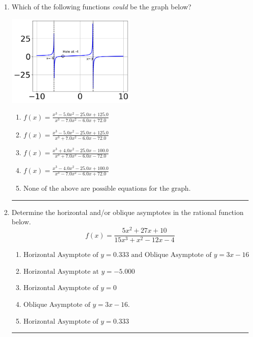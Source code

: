 \documentclass[14pt]{extbook}
\newcommand{\litem}[1]{\item#1\hspace*{-1cm}\rule{\textwidth}{0.4pt}}
\begin{document}
\begin{enumerate}
{\begin{enumerate}[label=\Alph*.]
\end{enumerate} }
\litem{
Which of the following functions \textit{could} be the graph below?
\begin{center}
    \includegraphics[width=0.5\textwidth]{../Figures/identifyGraphOfRationalFunctionCopyC.png}
\end{center}
\begin{enumerate}[label=\Alph*.]
\item \( f(x)=\frac{x^{3} -5.0 x^{2} -25.0 x + 125.0}{x^{3} -7.0 x^{2} -6.0 x + 72.0} \)
\item \( f(x)=\frac{x^{3} -5.0 x^{2} -25.0 x + 125.0}{x^{3} +7.0 x^{2} -6.0 x -72.0} \)
\item \( f(x)=\frac{x^{3} +4.0 x^{2} -25.0 x -100.0}{x^{3} +7.0 x^{2} -6.0 x -72.0} \)
\item \( f(x)=\frac{x^{3} -4.0 x^{2} -25.0 x + 100.0}{x^{3} -7.0 x^{2} -6.0 x + 72.0} \)
\item \( \text{None of the above are possible equations for the graph.} \)

\end{enumerate} }
\litem{
Determine the horizontal and/or oblique asymptotes in the rational function below.\[ f(x) = \frac{5x^{2} +27 x + 10}{15x^{3} + x^{2} -12 x -4} \]\begin{enumerate}[label=\Alph*.]
\item \( \text{Horizontal Asymptote of } y = 0.333 \text{ and Oblique Asymptote of } y = 3x -16 \)
\item \( \text{Horizontal Asymptote at } y = -5.000 \)
\item \( \text{Horizontal Asymptote of } y = 0 \)
\item \( \text{Oblique Asymptote of } y = 3x -16. \)
\item \( \text{Horizontal Asymptote of } y = 0.333  \)


\end{enumerate}}
\end{enumerate}
\end{document}
